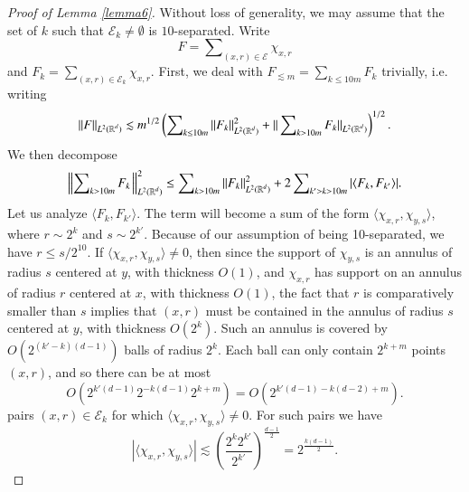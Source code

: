 \begin{proof}[Proof of Lemma \ref{lemma6}]
    Without loss of generality, we may assume that the set of $k$ such that $\mathcal{E}_k \neq \emptyset$ is $10$-separated. Write
    \begin{equation}
      F = \sum\nolimits_{(x,r) \in \mathcal{E}} \chi_{x,r}
    \end{equation}
    and $F_k = \sum\nolimits_{(x,r) \in \mathcal{E}_k} \chi_{x,r}$. First, we deal with $F_{\lesssim m} = \sum\nolimits_{k \leq 10 m} F_k$ trivially, i.e. writing
    \begin{equation}
        \| F \|_{L^2(\operatorname{\mathbb{R}}^d)} \lesssim m^{1/2} \left( \sum\nolimits_{k \leq 10m} \| F_k \|_{L^2(\operatorname{\mathbb{R}}^d)}^2 + \| \sum\nolimits_{k > 10m} F_k \|_{L^2(\operatorname{\mathbb{R}}^d)} \right)^{1/2}.
    \end{equation}
    We then decompose
    \begin{equation}
      \left\| \sum\nolimits_{k > 10 m} F_k\;\! \right\|_{L^2(\operatorname{\mathbb{R}}^d)}^2 \leq \sum\nolimits_{k > 10 m} \| F_k \|_{L^2(\operatorname{\mathbb{R}}^d)}^2 + 2 \sum\nolimits_{k' > k > 10m} |\langle F_k, F_{k'} \rangle|.
    \end{equation}
    Let us analyze $\langle F_k, F_{k'} \rangle$. The term will become a sum of the form $\langle \chi_{x,r}, \chi_{y,s} \rangle$, where $r \sim 2^k$ and $s \sim 2^{k'}$. Because of our assumption of being 10-separated, we have $r \leq s / 2^{10}$. If $\langle \chi_{x,r}, \chi_{y,s} \rangle \neq 0$, then since the support of $\chi_{y,s}$ is an annulus of radius $s$ centered at $y$, with thickness $O(1)$, and $\chi_{x,r}$ has support on an annulus of radius $r$ centered at $x$, with thickness $O(1)$, the fact that $r$ is comparatively smaller than $s$ implies that $(x,r)$ must be contained in the annulus of radius $s$ centered at $y$, with thickness $O(2^k)$. Such an annulus is covered by $O( 2^{(k'-k)(d-1)} )$ balls of radius $2^k$. Each ball can only contain $2^{k + m}$ points $(x,r)$, and so there can be at most
    \begin{equation}
      O(2^{k'(d-1)} 2^{-k(d-1)} 2^{k+m} ) = O( 2^{k'(d-1) - k(d-2) + m} ).
    \end{equation}
    pairs $(x,r) \in \mathcal{E}_k$ for which $\langle \chi_{x,r}, \chi_{y,s} \rangle \neq 0$. For such pairs we have
    \begin{equation}
      |\langle \chi_{x,r}, \chi_{y,s} \rangle| \lesssim \left( \frac{2^k 2^{k'}}{2^{k'}} \right)^{\frac{d-1}{2}} = 2^{\frac{k(d-1)}{2}}.
    \end{equation}

\end{proof}
